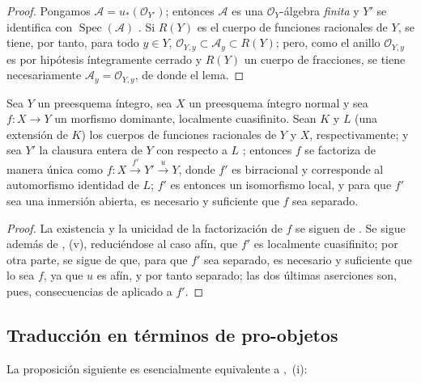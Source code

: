 \begin{proof}
Pongamos $\mathcal A=u_*(\mathcal O_{Y'})$; entonces $\mathcal A$ es una $\mathcal O_Y$-álgebra \emph{finita} y $Y'$ se identifica con $\operatorname{Spec}(\mathcal A)$ .
Si $R(Y)$ es el cuerpo de funciones racionales de $Y$, se tiene, por tanto, para todo $y\in Y$, $\mathcal O_{Y,y}\subset\mathcal A_y\subset R(Y)$; pero, como el anillo $\mathcal O_{Y,y}$ es por hipótesis íntegramente cerrado y $R(Y)$ un cuerpo de fracciones, se tiene necesariamente $\mathcal A_y=\mathcal O_{Y,y}$, de donde el lema.
\end{proof}

\begin{corollary}[8.12.11]
Sea $Y$ un preesquema íntegro, sea $X$ un preesquema íntegro normal y sea $f:X\to Y$ un morfismo dominante, localmente cuasifinito.
Sean $K$ y $L$ (una extensión de $K$) los cuerpos de funciones racionales de $Y$ y $X$, respectivamente; y sea $Y'$ la clausura entera de $Y$ con respecto a $L$ ; entonces $f$ se factoriza de manera única como $f:X\xrightarrow{f'}Y'\xrightarrow{u}Y$, donde $f'$ es birracional y corresponde al automorfismo identidad de $L$; $f'$ es entonces un isomorfismo local, y para que $f'$ sea una inmersión abierta, es necesario y suficiente que $f$ sea separado.
\end{corollary}

\begin{proof}
La existencia y la unicidad de la factorización de $f$ se siguen de .
Se sigue además de , (v), reduciéndose al caso afín, que $f'$ es localmente cuasifinito; por otra parte, se sigue de  que, para que $f'$ sea separado, es necesario y suficiente que lo sea $f$, ya que $u$ es afín, y por tanto separado; las dos últimas aserciones son, pues, consecuencias de  aplicado a $f'$.
\end{proof}


\subsection{Traducción en términos de pro-objetos}
\label{subsection:IV.8.13-fr}

La proposición siguiente es esencialmente equivalente a ,~(i):

